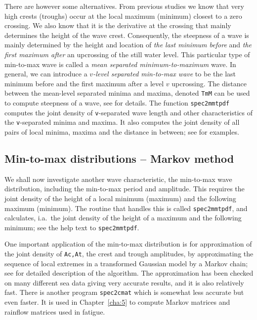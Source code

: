 There are however some alternatives. From previous studies we know
that very high crests (troughs) occur at the local maximum (minimum)
closest to a zero crossing. We also know that it is the
derivative at the crossing that mainly determines the height of the
wave crest. Consequently, the  steepness of a wave is mainly
determined by the height and location of {\it the last minimum before}
and {\it the first maximum after} an upcrossing of the still water
level. This particular type of min-to-max wave is called a {\it mean
  separated minimum-to-maximum} wave. In general, we can introduce a
{\it $v$-level separated min-to-max wave} to be the last minimum
before and the first maximum after a level $v$ upcrossing.
The distance between the mean-level separated minima and maxima,
denoted {\tt TmM} can be used to compute steepness of a wave, see
\cite{Brodtkorb2004Probability,Brodtkorb2006Evaluating} for details.
The function {\tt spec2mmtpdf} computes the joint density of
\verb+v+-separated wave length and other characteristics of the
{\tt v}-separated minima and maxima. It also computes the joint
density of all pairs of local minima, maxima and the distance
in between; see \cite{LindgrenAndBroberg2004Cycle} for examples.
 

\subsection{Min-to-max distributions -- Markov method}\label{sect3_5}

We shall now investigate another wave characteristic, the
min-to-max wave distribution, including the min-to-max period and
amplitude. This requires the joint density of the height of a local
minimum (maximum) and the following maximum (minimum). The \progname{}
routine that handles this is called \verb+spec2mmtpdf+, and
calculates, i.a.\ the joint density of the height of a maximum and
the following minimum; see the help text to \verb+spec2mmtpdf+.

One important application of the min-to-max distribution is for
approximation of the joint density of {\tt Ac,At}, the crest and
trough amplitudes, by approximating the sequence of local extremes in
a transformed Gaussian model by a Markov chain; see
\cite{RychlikEtal1997Modelling} for
detailed description of the algorithm. The approximation has been
checked on many different sea data giving very accurate results, and it
is also relatively fast.
There is another program {\tt spec2cmat} which  
is somewhat less accurate but even faster.
It is used in Chapter~\ref{cha:5} to compute Markov matrices and rainflow
matrices used in fatigue.

